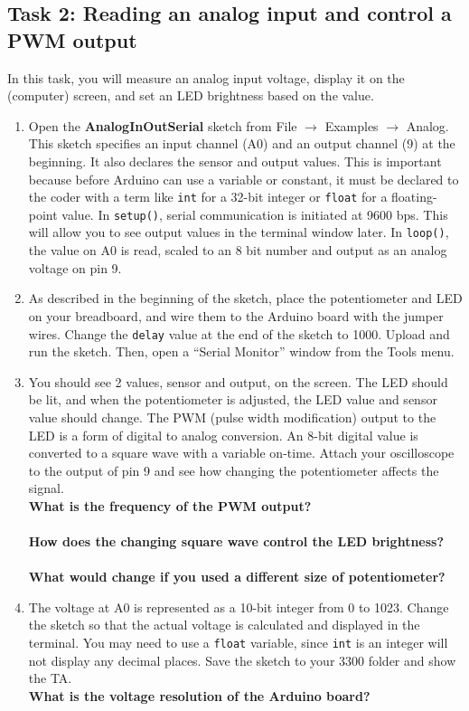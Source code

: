 \documentclass[12pt]{article}
\begin{document}
\subsection*{Task 2: Reading an analog input and control a PWM output}

In this task, you will measure an analog input voltage, display it on the (computer) screen, 
and set an LED brightness based on the value.

\begin{enumerate}
\item Open the {\bf AnalogInOutSerial} sketch from File $\rightarrow$ Examples $\rightarrow$ Analog. 
This sketch specifies an input channel (A0) and an output channel (9) at the beginning. 
It also declares the sensor and output values. 
This is important because before Arduino can use a variable or constant, it must be declared to the coder with a term like \texttt{int} for a 32-bit integer or \texttt{float} for a floating-point value. 
In \texttt{setup()}, serial communication is initiated at 9600 bps. 
This will allow you to see output values in the terminal window later. 
In \texttt{loop()}, the value on A0 is read, 
scaled to an 8 bit number and output as an analog voltage on pin 9.
\item As described in the beginning of the sketch, place the potentiometer and LED on your breadboard, and wire them to the Arduino board with the jumper wires. 
Change the \texttt{delay} value at the end of the sketch to 1000. 
Upload and run the sketch. 
Then, open a ``Serial Monitor'' window from the Tools menu.
\item You should see 2 values, sensor and output, on the screen. 
The LED should be lit, and when the potentiometer is adjusted, the LED value and sensor value should change. 
The PWM (pulse width modification) output to the LED is a form of digital to analog conversion. 
An 8-bit digital value is converted to a square wave with a variable on-time. 
Attach your oscilloscope to the output of pin 9 and see how changing the potentiometer affects the signal. \\
{\bf What is the frequency of the PWM output?} \\ 
\bigskip \bigskip \bigskip \\ 
{\bf How does the changing square wave control the LED brightness?}\\
\bigskip \bigskip \bigskip \\
{\bf What would change if you used a different size of potentiometer?}\\
\bigskip \bigskip \bigskip
\item The voltage at A0 is represented as a 10-bit integer from 0 to 1023. 
Change the sketch so that the actual voltage is calculated and displayed in the terminal. 
You may need to use a \texttt{float} variable, since \texttt{int} is an integer will not display any decimal places. 
Save the sketch to your 3300 folder and show the TA.\\
{\bf What is the voltage resolution of the Arduino board?}\\
\bigskip \bigskip \bigskip
\end{enumerate}
\end{document}

